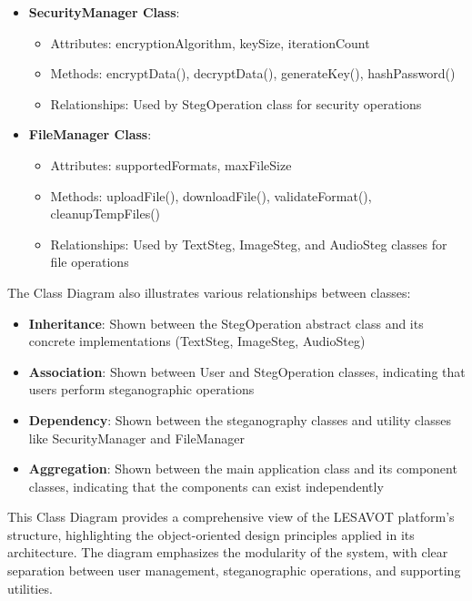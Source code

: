 \documentclass[12pt, a4paper, oneside]{book}
\begin{document}
\begin{itemize}[leftmargin=*]
    \item \textbf{SecurityManager Class}:
    \begin{itemize}
        \item Attributes: encryptionAlgorithm, keySize, iterationCount
        \item Methods: encryptData(), decryptData(), generateKey(), hashPassword()
        \item Relationships: Used by StegOperation class for security operations
    \end{itemize}

    \item \textbf{FileManager Class}:
    \begin{itemize}
        \item Attributes: supportedFormats, maxFileSize
        \item Methods: uploadFile(), downloadFile(), validateFormat(), cleanupTempFiles()
        \item Relationships: Used by TextSteg, ImageSteg, and AudioSteg classes for file operations
    \end{itemize}
\end{itemize}

The Class Diagram also illustrates various relationships between classes:

\begin{itemize}[leftmargin=*]
    \item \textbf{Inheritance}: Shown between the StegOperation abstract class and its concrete implementations (TextSteg, ImageSteg, AudioSteg)

    \item \textbf{Association}: Shown between User and StegOperation classes, indicating that users perform steganographic operations

    \item \textbf{Dependency}: Shown between the steganography classes and utility classes like SecurityManager and FileManager

    \item \textbf{Aggregation}: Shown between the main application class and its component classes, indicating that the components can exist independently
\end{itemize}

This Class Diagram provides a comprehensive view of the LESAVOT platform's structure, highlighting the object-oriented design principles applied in its architecture. The diagram emphasizes the modularity of the system, with clear separation between user management, steganographic operations, and supporting utilities.
\end{document}
